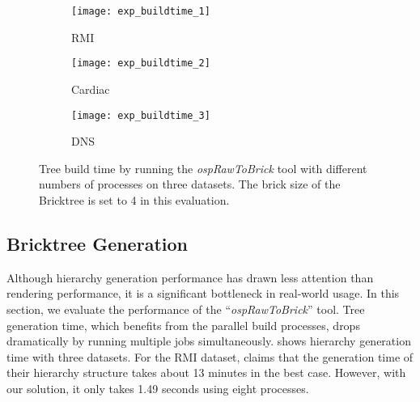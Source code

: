 \begin{figure}[h]
    \centering
    \begin{subfigure}[b]{0.32\columnwidth}
        \texttt{[image: exp\_buildtime\_1]}
        \vspace{-1.5em}
        \caption{RMI}
        \label{fig:exp_buildtime_1}
    \end{subfigure}
    \begin{subfigure}[b]{0.32\columnwidth}
        \texttt{[image: exp\_buildtime\_2]}
        \vspace{-1.5em}
        \caption{Cardiac}
        \label{fig:exp_buildtime_2}
    \end{subfigure}
    \begin{subfigure}[b]{0.32\columnwidth}
        \texttt{[image: exp\_buildtime\_3]}
        \vspace{-1.5em}
        \caption{DNS}
        \label{fig:exp_buildtime_3}
    \end{subfigure}
   
	\caption{\label{fig:exp_buildtime}%
	Tree build time by running the \textit{ospRawToBrick} tool with different numbers of processes on three datasets. The brick size of the Bricktree is set to 4 in this evaluation.}
	\vspace{-1em}
\end{figure}

\subsection{Bricktree Generation}

Although hierarchy generation performance has drawn less attention than rendering
performance, it is a significant bottleneck in real-world usage\cite{fogal2013analysis}. 
In this section, we evaluate the performance of the ``\textit{ospRawToBrick}'' tool. 
Tree generation time, which benefits from the parallel build processes, drops
dramatically by running multiple jobs simultaneously.  shows
 hierarchy generation time with three datasets. For the RMI dataset, \cite{fogal2013analysis} claims that the generation time of their hierarchy structure takes
about 13 minutes in the best case. However, with our solution, it only takes 1.49 seconds using
eight processes. 


